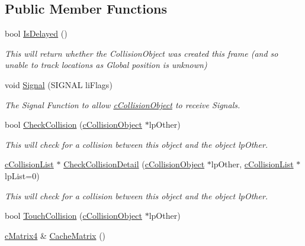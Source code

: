 \subsection*{Public Member Functions}
\begin{DoxyCompactItemize}
\item 
\hypertarget{classc_collision_object_a5e2c3c60b9001189d314cc76e18a581d}{
bool \hyperlink{classc_collision_object_a5e2c3c60b9001189d314cc76e18a581d}{IsDelayed} ()}
\label{classc_collision_object_a5e2c3c60b9001189d314cc76e18a581d}

\begin{DoxyCompactList}\small\item\em This will return whether the CollisionObject was created this frame (and so unable to track locations as Global position is unknown) \end{DoxyCompactList}\item 
\hypertarget{classc_collision_object_abec1a68ab54f2e80244c8b336bca3626}{
void \hyperlink{classc_collision_object_abec1a68ab54f2e80244c8b336bca3626}{Signal} (SIGNAL liFlags)}
\label{classc_collision_object_abec1a68ab54f2e80244c8b336bca3626}

\begin{DoxyCompactList}\small\item\em The Signal Function to allow \hyperlink{classc_collision_object}{cCollisionObject} to receive Signals. \end{DoxyCompactList}\item 
bool \hyperlink{classc_collision_object_a6f5b5341a726cb0a54fe3271b110dc8c}{CheckCollision} (\hyperlink{classc_collision_object}{cCollisionObject} $\ast$lpOther)
\begin{DoxyCompactList}\small\item\em This will check for a collision between this object and the object lpOther. \end{DoxyCompactList}\item 
\hyperlink{classc_collision_list}{cCollisionList} $\ast$ \hyperlink{classc_collision_object_a4fe3139893d4996304c63b1e4722a075}{CheckCollisionDetail} (\hyperlink{classc_collision_object}{cCollisionObject} $\ast$lpOther, \hyperlink{classc_collision_list}{cCollisionList} $\ast$lpList=0)
\begin{DoxyCompactList}\small\item\em This will check for a collision between this object and the object lpOther. \end{DoxyCompactList}\item 
bool \hyperlink{classc_collision_object_a1d93858e03da25f8656ae688c4dedbce}{TouchCollision} (\hyperlink{classc_collision_object}{cCollisionObject} $\ast$lpOther)
\item 
\hypertarget{classc_collision_object_abc47ab584910cc877b5e723be4e09eac}{
\hyperlink{classc_matrix4}{cMatrix4} \& \hyperlink{classc_collision_object_abc47ab584910cc877b5e723be4e09eac}{CacheMatrix} ()}
\label{classc_collision_object_abc47ab584910cc877b5e723be4e09eac}


\end{DoxyCompactItemize}
